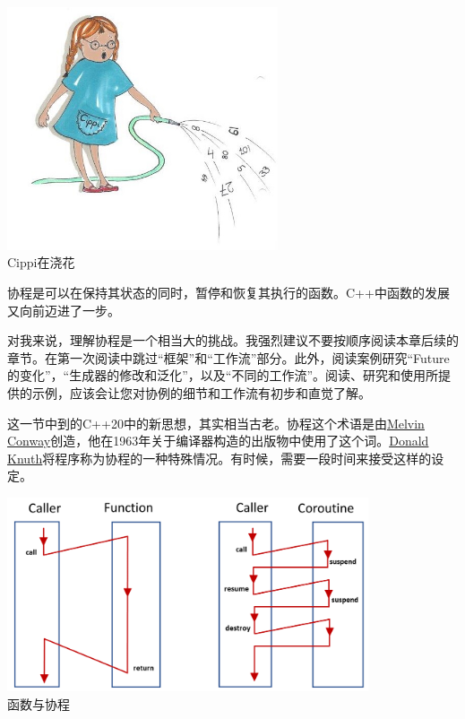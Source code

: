 \begin{center}
\includegraphics[width=0.6\textwidth]{content/3/chapter6/images/2.png}\\
Cippi在浇花
\end{center}

协程是可以在保持其状态的同时，暂停和恢复其执行的函数。C++中函数的发展又向前迈进了一步。

\begin{tcolorbox}[breakable,enhanced jigsaw,colback=red!5!white,colframe=red!75!black,title={挑战：理解协程}]
	
对我来说，理解协程是一个相当大的挑战。我强烈建议不要按顺序阅读本章后续的章节。在第一次阅读中跳过“框架”和“工作流”部分。此外，阅读案例研究“Future的变化”，“生成器的修改和泛化”，以及“不同的工作流”。阅读、研究和使用所提供的示例，应该会让您对协例的细节和工作流有初步和直觉了解。
	
\end{tcolorbox}

这一节中到的C++20中的新思想，其实相当古老。协程这个术语是由\href{https://en.wikipedia.org/wiki/Melvin_Conway}{Melvin Conway}创造，他在1963年关于编译器构造的出版物中使用了这个词。\href{https://en.wikipedia.org/wiki/Donald_Knuth}{Donald Knuth}将程序称为协程的一种特殊情况。有时候，需要一段时间来接受这样的设定。

\begin{center}
\includegraphics[width=0.8\textwidth]{content/3/chapter6/images/3.png}\\
函数与协程
\end{center}

